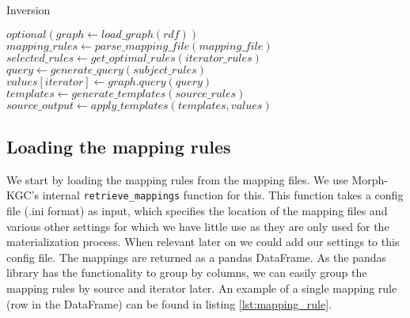\begin{algorithm}
    \caption{Inversion}
    \label{alg:inversion}
    \begin{algorithmic}[1]
        \State $optional(graph \gets load\_graph(rdf))$
            \State $mapping\_rules \gets parse\_mapping\_file(mapping\_file)$
        \EndFor
                \State $selected\_rules \gets get\_optimal\_rules(iterator\_rules)$
                    \State $query \gets generate\_query(subject\_rules)$
                    \State $values[iterator] \gets graph.query(query)$
                \EndFor
            \EndFor
            \State $templates \gets generate\_templates(source\_rules)$
            \State $source\_output \gets apply\_templates(templates, values)$
        \EndFor
    \end{algorithmic}
\end{algorithm}

\subsection{Loading the mapping rules}
We start by loading the mapping rules from the mapping files. We use Morph-KGC's internal \texttt{retrieve\_mappings} function for this. This function takes a config file (.ini format) as input, which specifies the location of the mapping files and various other settings for which we have little use as they are only used for the materialization process. When relevant later on we could add our settings to this config file.
The mappings are returned as a pandas DataFrame. As the pandas library has the functionality to group by columns, we can easily group the mapping rules by source and iterator later. An example of a single mapping rule (row in the DataFrame) can be found in listing \ref{lst:mapping_rule}.

